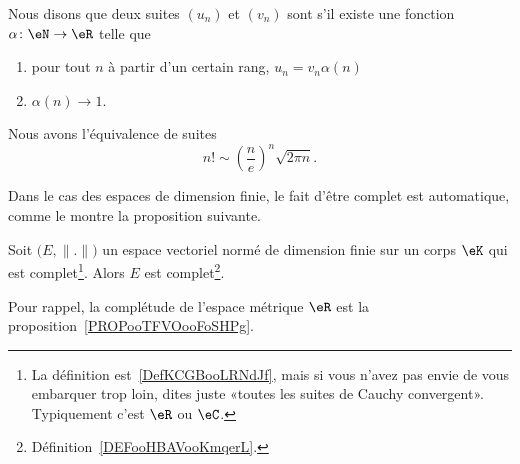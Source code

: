 \begin{definition}      \label{DEFooEWRTooKgShmT}
    Nous disons que deux suites \( (u_n)\) et \( (v_n)\) sont  s'il existe une fonction \( \alpha\colon \eN\to \eR\) telle que
    \begin{enumerate}
        \item
            pour tout \( n\) à partir d'un certain rang, \( u_n=v_n\alpha(n)\)
        \item
            \( \alpha(n)\to 1\).
    \end{enumerate}
\end{definition}

\begin{lemma}        \label{LemCEoBqrP}
    Nous avons l'équivalence de suites
    \begin{equation}
        n!\sim \left( \frac{ n }{ e } \right)^n\sqrt{2\pi n}.
    \end{equation}
\end{lemma}

Dans le cas des espaces de dimension finie, le fait d'être complet est automatique, comme le montre la proposition suivante.
\begin{proposition}     \label{PROPooGJDTooXOoYfw}
    Soit \( \big( E,\| . \| \big)\) un espace vectoriel normé de dimension finie sur un corps \( \eK\) qui est complet\footnote{La définition est~\ref{DefKCGBooLRNdJf}, mais si vous n'avez pas envie de vous embarquer trop loin, dites juste «toutes les suites de Cauchy convergent». Typiquement c'est \( \eR\) ou \( \eC\).}. Alors \( E\) est complet\footnote{Définition~\ref{DEFooHBAVooKmqerL}.}.
\end{proposition}
Pour rappel, la complétude de l'espace métrique \( \eR\) est la proposition~\ref{PROPooTFVOooFoSHPg}.

